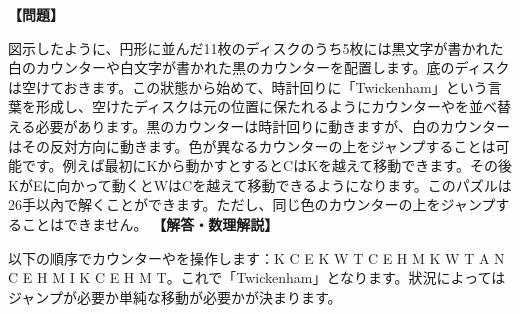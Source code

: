 \documentclass[10pt,a4paper,oneside,openany]{ltjsbook}
\begin{document}
\begin{tcolorbox}[colback=softblue,colframe=primaryblue,title=\textbf{第 217 問：トウィケンハムのパズル （原題: THE TWICKENHAM PUZZLE.）},arc=2mm,boxrule=1pt,breakable]
\textbf{【問題】}\par\vspace{0.3em}
図示したように、円形に並んだ11枚のディスクのうち5枚には黒文字が書かれた白のカウンターや白文字が書かれた黒のカウンターを配置します。底のディスクは空けておきます。この狀態から始めて、時計回りに「Twickenham」という言葉を形成し、空けたディスクは元の位置に保たれるようにカウンターやを並べ替える必要があります。黒のカウンターは時計回りに動きますが、白のカウンターはその反対方向に動きます。色が異なるカウンターの上をジャンプすることは可能です。例えば最初にKから動かすとするとCはKを越えて移動できます。その後KがEに向かって動くとWはCを越えて移動できるようになります。このパズルは26手以內で解くことができます。ただし、同じ色のカウンターの上をジャンプすることはできません。
\tcblower
\textbf{【解答・数理解説】}\par\vspace{0.3em}
以下の順序でカウンターやを操作します：K C E K W T C E H M K W T A N C E H M I K C E H M T。これで「Twickenham」となります。狀況によってはジャンプが必要か単純な移動が必要かが決まります。
\end{tcolorbox}
\end{document}
